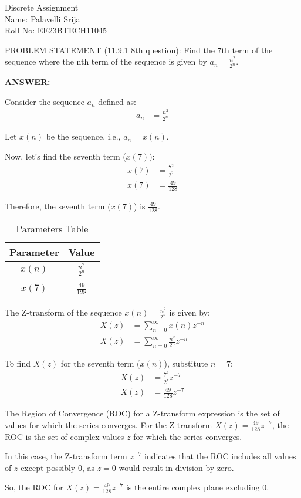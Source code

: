 \documentclass{article}
\begin{document}
\begin{center}
    Discrete Assignment\\
    Name: Palavelli Srija\\
    Roll No: EE23BTECH11045
\end{center}

PROBLEM STATEMENT (11.9.1 8th question): Find the 7th term of the sequence where the nth term of the sequence is given by \(a_n = \frac{n^2}{2^n}\).

\textbf{ANSWER:}

Consider the sequence \(a_n\) defined as:
\begin{align}
    a_n &= \frac{n^2}{2^n}
\end{align}

Let \(x(n)\) be the sequence, i.e., \(a_n = x(n)\).

Now, let's find the seventh term (\(x(7)\)):
\begin{align}
    x(7) &= \frac{7^2}{2^7} \\
    x(7) &= \frac{49}{128}
\end{align}

Therefore, the seventh term (\(x(7)\)) is \(\frac{49}{128}\).

\begin{table}[h]
    \centering
    \caption{Parameters Table}
    \begin{tabular}{|c|c|}
        \hline
        \textbf{Parameter} & \textbf{Value} \\
        \hline
        \(x(n)\) & \(\frac{n^2}{2^n}\) \\ \\
        \(x(7)\) & \(\frac{49}{128}\) \\
        \hline   
    \end{tabular}
\end{table}

The Z-transform of the sequence \(x(n) = \frac{n^2}{2^n}\) is given by:
\begin{align}
    X(z) &= \sum_{n=0}^{\infty} x(n) z^{-n} \\
    X(z) &= \sum_{n=0}^{\infty} \frac{n^2}{2^n} z^{-n}
\end{align}

To find \(X(z)\) for the seventh term (\(x(n)\)), substitute \(n = 7\):
\begin{align}
    X(z) &= \frac{7^2}{2^7} z^{-7} \\
    X(z) &= \frac{49}{128} z^{-7}
\end{align}

The Region of Convergence (ROC) for a Z-transform expression is the set of values for which the series converges. For the Z-transform \(X(z) = \frac{49}{128} z^{-7}\), the ROC is the set of complex values \(z\) for which the series converges.

In this case, the Z-transform term \(z^{-7}\) indicates that the ROC includes all values of \(z\) except possibly 0, as \(z = 0\) would result in division by zero.

So, the ROC for \(X(z) = \frac{49}{128} z^{-7}\) is the entire complex plane excluding 0.
\end{document}
